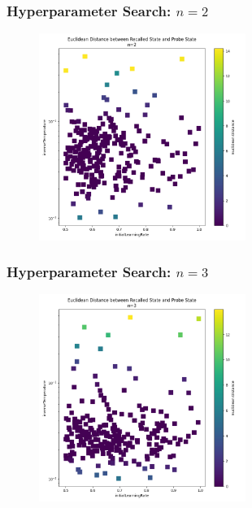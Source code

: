 \begin{frame}
    \frametitle{Hyperparameter Search: \(n=2\)}

    \begin{figure}
        \includegraphics[width=0.6\textwidth]{images/initialHyperparameterSearches/2.png}
    \end{figure}
\end{frame}

\begin{frame}
    \frametitle{Hyperparameter Search: \(n=3\)}

    \begin{figure}
        \includegraphics[width=0.6\textwidth]{images/initialHyperparameterSearches/3.png}
    \end{figure}
\end{frame}

